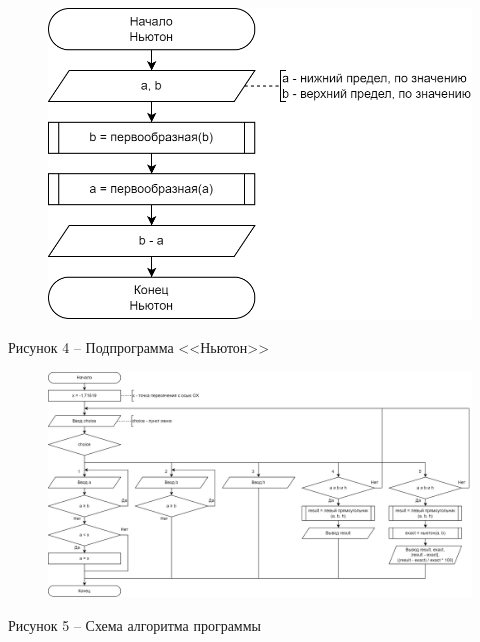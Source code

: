 \documentclass[a4paper,14pt]{extarticle}
\begin{document}
  \pagebreak
  \begin{figure}[h]
    \centering
    \includegraphics[width=0.6\linewidth]{images/s-3}
  \end{figure}
  \begin{center}
    Рисунок 4 – Подпрограмма <<Ньютон>>
  \end{center}

  \begin{figure}[h]
    \centering
    \includegraphics[width=1\linewidth]{images/s-5}
  \end{figure}
  \begin{center}
    Рисунок 5 – Схема алгоритма программы
  \end{center}
\end{document}
